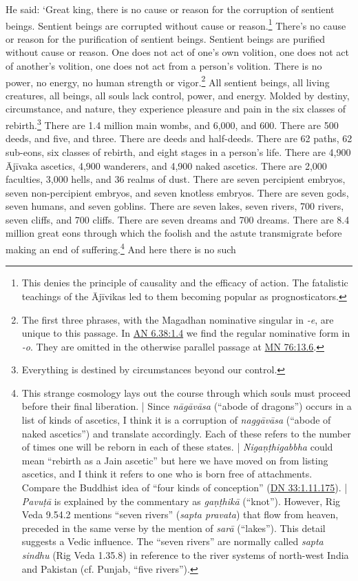\documentclass[12pt,openany]{book}%
\begin{document}
He said: ‘Great king, there is no cause or reason for the corruption of sentient beings. Sentient beings are corrupted without cause or reason.\footnote{This denies the principle of causality and the efficacy of action. The fatalistic teachings of the \textsanskrit{Ājīvikas} led to them becoming popular as prognosticators. } There’s no cause or reason for the purification of sentient beings. Sentient beings are purified without cause or reason. One does not act of one’s own volition, one does not act of another’s volition, one does not act from a person’s volition. There is no power, no energy, no human strength or vigor.\footnote{The first three phrases, with the Magadhan nominative singular in \textit{-e}, are unique to this passage. In \href{https://suttacentral.net/an6.38/en/sujato\#1.4}{AN 6.38:1.4} we find the regular nominative form in \textit{-o}. They are omitted in the otherwise parallel passage at \href{https://suttacentral.net/mn76/en/sujato\#13.6}{MN 76:13.6}. } All sentient beings, all living creatures, all beings, all souls lack control, power, and energy. Molded by destiny, circumstance, and nature, they experience pleasure and pain in the six classes of rebirth.\footnote{Everything is destined by circumstances beyond our control. } There are 1.4 million main wombs, and 6,000, and 600. There are 500 deeds, and five, and three. There are deeds and half-deeds. There are 62 paths, 62 sub-eons, six classes of rebirth, and eight stages in a person’s life. There are 4,900 \textsanskrit{Ājīvaka} ascetics, 4,900 wanderers, and 4,900 naked ascetics. There are 2,000 faculties, 3,000 hells, and 36 realms of dust. There are seven percipient embryos, seven non-percipient embryos, and seven knotless embryos. There are seven gods, seven humans, and seven goblins. There are seven lakes, seven rivers, 700 rivers, seven cliffs, and 700 cliffs. There are seven dreams and 700 dreams. There are 8.4 million great eons through which the foolish and the astute transmigrate before making an end of suffering.\footnote{This strange cosmology lays out the course through which souls must proceed before their final liberation. | Since \textit{\textsanskrit{nāgāvāsa}} (“abode of dragons”) occurs in a list of kinds of ascetics, I think it is a corruption of \textit{\textsanskrit{naggāvāsa}} (“abode of naked ascetics”) and translate accordingly. Each of these refers to the number of times one will be reborn in each of these states. | \textit{\textsanskrit{Nigaṇṭhigabbha}} could mean “rebirth as a Jain ascetic” but here we have moved on from listing ascetics, and I think it refers to one who is born free of attachments. Compare the Buddhist idea of “four kinds of conception” (\href{https://suttacentral.net/dn33/en/sujato\#1.11.175}{DN 33:1.11.175}). | \textit{\textsanskrit{Pavuṭā}} is explained by the commentary as \textit{\textsanskrit{gaṇṭhikā}} (“knot”). However, Rig Veda 9.54.2 mentions “seven rivers” (\textit{sapta pravata}) that flow from heaven, preceded in the same verse by the mention of \textit{\textsanskrit{sarā}} (“lakes”). This detail suggests a Vedic influence. The “seven rivers” are normally called \textit{sapta sindhu} (Rig Veda 1.35.8) in reference to the river systems of north-west India and Pakistan (cf. Punjab, “five rivers”). } And here there is no such 
\end{document}
